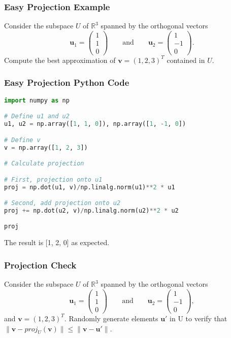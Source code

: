 \documentclass{beamer}
\begin{document}
\begin{frame}[t]
\frametitle{Easy Projection Example}
\begin{Example}
Consider the subspace $U$ of $\mathbb{R}^3$ spanned by the orthogonal vectors 
$$
{\boldsymbol u_1} = \left(\begin{array}{c} 1\\ 1\\ 0\end{array}\right)\qquad\text{and}\qquad {\boldsymbol u_2} = \left(\begin{array}{c} 1\\ -1\\ 0\end{array}\right).
$$
Compute the best approximation of ${\boldsymbol v} =(1, 2, 3)^T$ contained in $U$.
\end{Example}
\end{frame}

\begin{frame}[fragile]
\frametitle{Easy Projection Python Code}
\begin{lstlisting}[language=Python]
import numpy as np

# Define u1 and u2
u1, u2 = np.array([1, 1, 0]), np.array([1, -1, 0])

# Define v
v = np.array([1, 2, 3])

# Calculate projection

# First, projection onto u1
proj = np.dot(u1, v)/np.linalg.norm(u1)**2 * u1 

# Second, add projection onto u2
proj += np.dot(u2, v)/np.linalg.norm(u2)**2 * u2

proj
\end{lstlisting}
The result is [1, 2, 0] as expected.
\end{frame}

\begin{frame}[t]
\frametitle{Projection Check}
\begin{Example}
Consider the subspace $U$ of $\mathbb{R}^3$ spanned by the orthogonal vectors 
$$
{\boldsymbol u_1} = \left(\begin{array}{c} 1\\ 1\\ 0\end{array}\right)\qquad\text{and}\qquad {\boldsymbol u_2} = \left(\begin{array}{c} 1\\ -1\\ 0\end{array}\right),
$$
and ${\boldsymbol v} =(1, 2, 3)^T$. Randomly generate elements ${\boldsymbol u'}$ in U to verify that  $\| {\boldsymbol v} - proj_U({\boldsymbol v})\| \leq \| {\boldsymbol v} - {\boldsymbol u'}\|$.
\end{Example}
\end{frame}
\end{document}
